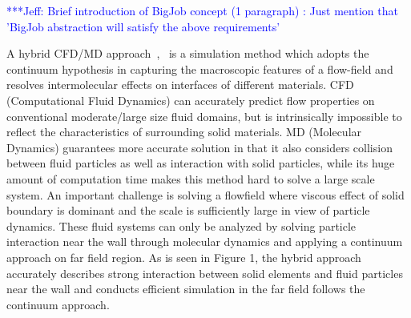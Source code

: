 \documentclass[times, 10pt,twocolumn]{article}
\newcommand{\skonote}[1]{ {\textcolor{blue} { ***Jeff: #1 }}}
\newcommand{\skonote}[1]{}
\begin{document}
\skonote{Brief introduction of BigJob concept (1 paragraph)
: Just mention that 'BigJob abstraction will satisfy the above requirements'}

A hybrid CFD/MD approach~\cite{Nie:2004},~\cite{Yen:2007} is a simulation method which adopts the continuum hypothesis in capturing the macroscopic features of a flow-field and resolves intermolecular effects on interfaces of different materials. CFD (Computational Fluid Dynamics) can accurately predict flow properties on conventional moderate/large size fluid domains, but is intrinsically impossible to reflect the characteristics of surrounding solid materials. MD (Molecular Dynamics) guarantees more accurate solution in that it also considers collision between fluid particles as well as interaction with solid particles, while its huge amount of computation time makes this method hard to solve a large scale system. An important challenge is solving a flowfield where viscous effect of solid boundary is dominant and the scale is sufficiently large in view of particle dynamics. These fluid systems can only be analyzed by solving particle interaction near the wall through molecular dynamics and applying a continuum approach on far field region. As is seen in Figure 1, the hybrid approach accurately describes strong interaction between solid elements and fluid particles near the wall and conducts efficient simulation in the far field follows the continuum approach.
\end{document}
